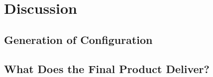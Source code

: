 \chapter{Discussion}\label{ch:discussion}



\section{Generation of Configuration}

\section{What Does the Final Product Deliver?}